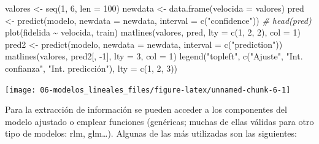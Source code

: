 \documentclass[
]{book}
\newenvironment{Shaded}{\begin{snugshade}}{\end{snugshade}}
\newcommand{\AttributeTok}[1]{\textcolor[rgb]{0.77,0.63,0.00}{#1}}
\newcommand{\CommentTok}[1]{\textcolor[rgb]{0.56,0.35,0.01}{\textit{#1}}}
\newcommand{\DecValTok}[1]{\textcolor[rgb]{0.00,0.00,0.81}{#1}}
\newcommand{\FunctionTok}[1]{\textcolor[rgb]{0.00,0.00,0.00}{#1}}
\newcommand{\NormalTok}[1]{#1}
\newcommand{\OtherTok}[1]{\textcolor[rgb]{0.56,0.35,0.01}{#1}}
\newcommand{\SpecialCharTok}[1]{\textcolor[rgb]{0.00,0.00,0.00}{#1}}
\newcommand{\StringTok}[1]{\textcolor[rgb]{0.31,0.60,0.02}{#1}}
\theoremstyle{break}
\theoremstyle{definition}
\theoremstyle{definition}
\theoremstyle{definition}
\theoremstyle{definition}
\theoremstyle{remark}
\begin{document}
\begin{Shaded}
\begin{Highlighting}[]
\NormalTok{valores }\OtherTok{\textless{}{-}} \FunctionTok{seq}\NormalTok{(}\DecValTok{1}\NormalTok{, }\DecValTok{6}\NormalTok{, }\AttributeTok{len =} \DecValTok{100}\NormalTok{)}
\NormalTok{newdata }\OtherTok{\textless{}{-}} \FunctionTok{data.frame}\NormalTok{(}\AttributeTok{velocida =}\NormalTok{ valores)}
\NormalTok{pred }\OtherTok{\textless{}{-}} \FunctionTok{predict}\NormalTok{(modelo, }\AttributeTok{newdata =}\NormalTok{ newdata, }\AttributeTok{interval =} \FunctionTok{c}\NormalTok{(}\StringTok{"confidence"}\NormalTok{))}
\CommentTok{\# head(pred)}
\FunctionTok{plot}\NormalTok{(fidelida }\SpecialCharTok{\textasciitilde{}}\NormalTok{ velocida, train)}
\FunctionTok{matlines}\NormalTok{(valores, pred, }\AttributeTok{lty =} \FunctionTok{c}\NormalTok{(}\DecValTok{1}\NormalTok{, }\DecValTok{2}\NormalTok{, }\DecValTok{2}\NormalTok{), }\AttributeTok{col =} \DecValTok{1}\NormalTok{)}
\NormalTok{pred2 }\OtherTok{\textless{}{-}} \FunctionTok{predict}\NormalTok{(modelo, }\AttributeTok{newdata =}\NormalTok{ newdata, }\AttributeTok{interval =} \FunctionTok{c}\NormalTok{(}\StringTok{"prediction"}\NormalTok{))}
\FunctionTok{matlines}\NormalTok{(valores, pred2[, }\SpecialCharTok{{-}}\DecValTok{1}\NormalTok{], }\AttributeTok{lty =} \DecValTok{3}\NormalTok{, }\AttributeTok{col =} \DecValTok{1}\NormalTok{)}
\FunctionTok{legend}\NormalTok{(}\StringTok{"topleft"}\NormalTok{, }\FunctionTok{c}\NormalTok{(}\StringTok{"Ajuste"}\NormalTok{, }\StringTok{"Int. confianza"}\NormalTok{, }\StringTok{"Int. predicción"}\NormalTok{), }\AttributeTok{lty =} \FunctionTok{c}\NormalTok{(}\DecValTok{1}\NormalTok{, }\DecValTok{2}\NormalTok{, }\DecValTok{3}\NormalTok{))}
\end{Highlighting}
\end{Shaded}

\begin{center}\texttt{[image: 06-modelos\_lineales\_files/figure-latex/unnamed-chunk-6-1]} \end{center}

Para la extracción de información se pueden acceder a los componentes del modelo ajustado o emplear funciones (genéricas; muchas de ellas válidas para otro tipo de modelos: rlm, glm\ldots).
Algunas de las más utilizadas son las siguientes:
\end{document}
